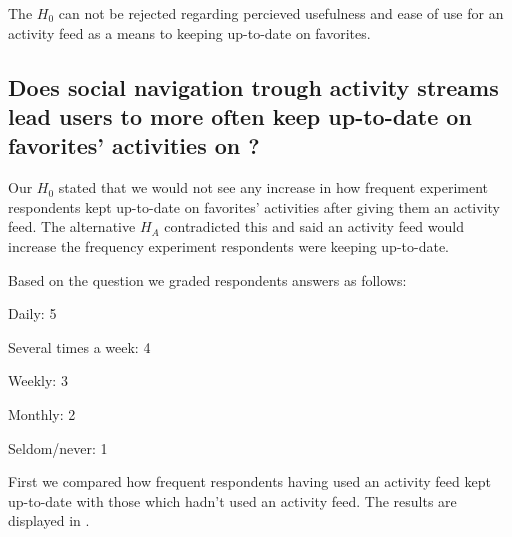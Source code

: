 The $H_0$ can
not be rejected regarding percieved usefulness and ease of use for an activity
feed as a means to keeping up-to-date on favorites.

\subsection{%
  Does social navigation trough activity streams lead users to more often keep
  up-to-date on favorites' activities on \urort{}?
}

Our $H_0$ stated that we would not see any increase in how frequent
experiment respondents kept up-to-date on favorites' activities after giving
them an activity feed. The alternative $H_A$ contradicted this and said
an activity feed would increase the frequency experiment respondents were
keeping up-to-date.

Based on the question
we graded respondents answers as follows: 

\begin{items}
  \item Daily: 5
  \item Several times a week: 4
  \item Weekly: 3
  \item Monthly: 2
  \item Seldom/never: 1
\end{items}

First we compared how frequent respondents having used an activity feed kept
up-to-date with those which hadn't used an activity feed. The results are
displayed in .

